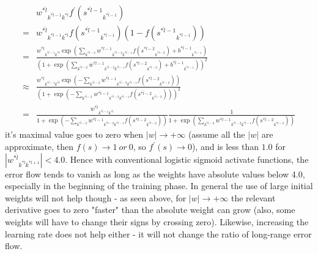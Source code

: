 \documentclass[runningheads,openany]{xhlPaper}
\begin{document}
\begin{equation}
\label{equ:mlp_vanish_logistic_vanish}
\begin{aligned}
&{w^{*\hat l}}_{{k^{*\hat l - 1}}{k^{*\hat l}}}{f^{'}}\left( {{s^{*\hat l - 1}}_{{k^{*\hat l - 1}}}} \right)\\
 =& {w^{*\hat l}}_{{k^{*\hat l - 1}}{k^{*\hat l}}}f\left( {{s^{*\hat l - 1}}_{{k^{*\hat l - 1}}}} \right)\left( {1 - f\left( {{s^{*\hat l - 1}}_{{k^{*\hat l - 1}}}} \right)} \right)\\
 =& \frac{{{w^{*\hat l}}_{{k^{*\hat l - 1}}{k^{*\hat l}}}\exp \left( {\sum\limits_{{k^{*\hat l - 2}}} {{w^{*\hat l - 1}}_{{k^{*\hat l - 2}}{k^{*\hat l - 1}}}f\left( {{s^{*\hat l - 2}}_{{k^{*\hat l - 2}}}} \right)}  + {b^{*\hat l - 1}}_{{k^{*\hat l - 1}}}} \right)}}{{{{\left( {1 + \exp \left( {\sum\limits_{{k^{*\hat l - 2}}} {{w^{*\hat l - 1}}_{{k^{*\hat l - 2}}{k^{*\hat l - 1}}}f\left( {{s^{*\hat l - 2}}_{{k^{*\hat l - 2}}}} \right)}  + {b^{*\hat l - 1}}_{{k^{*\hat l - 1}}}} \right)} \right)}^2}}}\\
 \approx &\frac{{{w^{*\hat l}}_{{k^{*\hat l - 1}}{k^{*\hat l}}}\exp \left( { - \sum\limits_{{k^{*\hat l - 2}}} {{w^{*\hat l - 1}}_{{k^{*\hat l - 2}}{k^{*\hat l - 1}}}f\left( {{s^{*\hat l - 2}}_{{k^{*\hat l - 2}}}} \right)} } \right)}}{{{{\left( {1 + \exp \left( { - \sum\limits_{{k^{*\hat l - 2}}} {{w^{*\hat l - 1}}_{{k^{*\hat l - 2}}{k^{*\hat l - 1}}}f\left( {{s^{*\hat l - 2}}_{{k^{*\hat l - 2}}}} \right)} } \right)} \right)}^2}}}\\
=& \frac{{{w^{*\hat l}}_{{k^{*\hat l - 1}}{k^{*\hat l}}}}}{{1 + \exp \left( { - \sum\limits_{{k^{*\hat l - 2}}} {{w^{*\hat l - 1}}_{{k^{*\hat l - 2}}{k^{*\hat l - 1}}}f\left( {{s^{*\hat l - 2}}_{{k^{*\hat l - 2}}}} \right)} } \right)}}\frac{1}{{1 + \exp \left( {\sum\limits_{{k^{*\hat l - 2}}} {{w^{*\hat l - 1}}_{{k^{*\hat l - 2}}{k^{*\hat l - 1}}}f\left( {{s^{*\hat l - 2}}_{{k^{*\hat l - 2}}}} \right)} } \right)}}
\end{aligned}
\end{equation}
it's maximal value goes to zero when $|w| \to  + \infty $ (assume all the $|w|$ are approximate, then ${f}\left( s \right) \to 1\ or\ 0$, so ${f^{'}}\left( s\right) \to 0$), and is less than $1.0$ for $|{w^{*\hat l}}_{{k^{*\hat l}}{k^{*\hat l + 1}}}| < 4.0$.
Hence with conventional logistic sigmoid activate functions, the error flow tends to vanish as long as the weights have absolute values below 4.0, especially in the beginning of the training phase.
In general the use of large initial weights will not help though - as seen above, for $|w| \to  + \infty $ the relevant derivative goes to zero "faster" than the absolute weight can grow (also, some weights will have to change their signs by crossing zero).
Likewise, increasing the learning rate does not help either - it will not change the ratio of long-range error flow.
\end{document}
